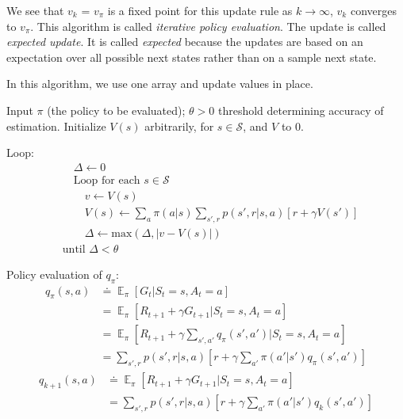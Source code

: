 \documentclass[lang=en,mode=geye,device=normal,color=blue,14pt]{elegantnote}
\DeclareMathOperator*{\E}{\mathbb{E}}
\DeclareMathOperator*{\1}{\mathbbm{1}}
\begin{document}
We see that $v_k$ = $v_\pi$ is a fixed point for this update rule as $k \rightarrow \infty$, $v_k$ converges to $v_\pi$. This algorithm is called \textit{iterative policy evaluation}.
The update is called \textit{expected update}. It is called \textit{expected} because the updates are based on an expectation over all possible next states rather than on a sample next state.

In this algorithm, we use one array and update values in place.
\begin{tcolorbox}[width=\textwidth,title={Iterative Policy Evaluation, for estimating $V \approx v_\pi$}]
Input $\pi$ (the policy to be evaluated); $\theta > 0$ threshold determining accuracy of estimation.
Initialize $V(s)$ arbitrarily, for $s \in \mathcal{S}$, and $V$ to 0.

Loop:
\begin{align*}
&\quad\Delta \leftarrow 0 \\
&\quad\text{Loop for each } s \in \mathcal{S} \\
&\quad\quad v \leftarrow V(s) \\
&\quad\quad V(s) \leftarrow \sum_a \pi (a|s) \sum_{s',r} p(s',r|s,a)[r + \gamma V(s')] \\
&\quad\quad \Delta \leftarrow \text{max}(\Delta, |v-V(s)|) \\
&\text{until } \Delta < \theta
\end{align*}
\end{tcolorbox}


Policy evaluation of $q_\pi$:
\begin{align*}
q_\pi(s,a) & \doteq \E_\pi [G_t | S_t = s, A_t = a] \\
& = \E_\pi [R_{t+1} + \gamma G_{t+1} | S_t = s, A_t = a] \\
& = \E_\pi [R_{t+1} + \gamma \sum_{s',a'} q_\pi (s',a') | S_t = s, A_t = a] \\
& = \sum_{s',r} p(s',r|s,a) [ r+ \gamma \sum_{a'} \pi(a'|s')q_\pi(s',a')]
\end{align*}
\begin{align*}
q_{k+1}(s,a) & \doteq \E_\pi [R_{t+1} + \gamma G_{t+1} | S_t = s, A_t = a] \\
& = \sum_{s',r} p(s',r|s,a)[r+\gamma \sum_{a'} \pi (a'|s')q_k(s',a')]
\end{align*}
\end{document}
